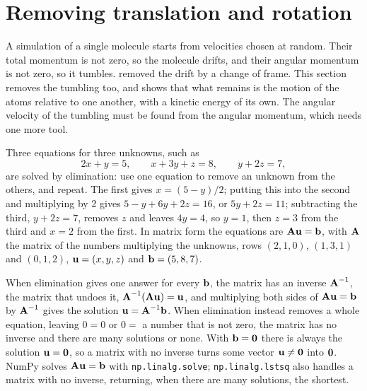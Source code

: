 \section{Removing translation and rotation}
\label{sec:ro-remove}

A simulation of a single molecule starts from velocities chosen at random.
Their total momentum is not zero, so the molecule drifts, and their
angular momentum is not zero, so it tumbles.  removed
the drift by a change of frame. This section removes the tumbling too, and
shows that what remains is the motion of the atoms relative to one
another, with a kinetic energy of its own. The angular velocity of the
tumbling must be found from the angular momentum, which needs one more
tool.

\begin{toolbox}
Three equations for three unknowns, such as
\begin{equation*}
   2x + y = 5 , \qquad x + 3y + z = 8 , \qquad y + 2z = 7 ,
\end{equation*}
are solved by elimination: use one equation to remove an unknown from the
others, and repeat. The first gives $x = (5 - y)/2$; putting this into the
second and multiplying by 2 gives $5 - y + 6y + 2z = 16$, or $5y + 2z =
11$; subtracting the third, $y + 2z = 7$, removes $z$ and leaves $4y = 4$,
so $y = 1$, then $z = 3$ from the third and $x = 2$ from the first. In
matrix form the equations are $\bm{\mathrm{A}}\bm{\mathrm{u}} = \bm{\mathrm{b}}$, with $\bm{\mathrm{A}}$ the
matrix of the numbers multiplying the unknowns, rows $(2, 1, 0)$, $(1, 3,
1)$ and $(0, 1, 2)$, $\bm{\mathrm{u}} = (x, y, z)$ and $\bm{\mathrm{b}} = (5, 8, 7)$.

When elimination gives one answer for every $\bm{\mathrm{b}}$, the matrix has an
inverse $\bm{\mathrm{A}}^{-1}$, the matrix that undoes it, $\bm{\mathrm{A}}^{-1}(\bm{\mathrm{A}}\bm{\mathrm{u}})
= \bm{\mathrm{u}}$, and multiplying both sides of $\bm{\mathrm{A}}\bm{\mathrm{u}} = \bm{\mathrm{b}}$
by $\bm{\mathrm{A}}^{-1}$ gives the solution $\bm{\mathrm{u}} = \bm{\mathrm{A}}^{-1}\bm{\mathrm{b}}$. When
elimination instead removes a whole equation, leaving $0 = 0$ or $0 =$ a
number that is not zero, the matrix has no inverse and there are many
solutions or none. With $\bm{\mathrm{b}} = \bm{\mathrm{0}}$ there is always the solution
$\bm{\mathrm{u}} = \bm{\mathrm{0}}$, so a matrix with no inverse turns some vector $\bm{\mathrm{u}}
\neq \bm{\mathrm{0}}$ into $\bm{\mathrm{0}}$. NumPy solves $\bm{\mathrm{A}}\bm{\mathrm{u}} = \bm{\mathrm{b}}$ with
\texttt{np.linalg.solve}; \texttt{np.linalg.lstsq} also handles a matrix
with no inverse, returning, when there are many solutions, the shortest.
\end{toolbox}

